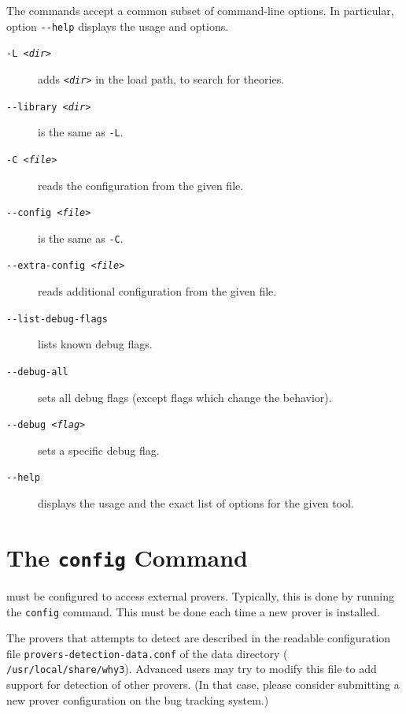 The commands accept a common subset of command-line options. In
particular, option \verb|--help| displays the usage and options.
\begin{description}
\item[\texttt{-L \textsl{<dir>}}]
  adds \texttt{\textsl{<dir>}} in the load path, to search for theories.
\item[\texttt{-{}-library \textsl{<dir>}}]
  is the same as \verb|-L|.
\item[\texttt{-C \textsl{<file>}}]
  reads the configuration from the given file.
\item[\texttt{-{}-config \textsl{<file>}}]
  is the same as \verb|-C|.
\item[\texttt{-{}-extra-config \textsl{<file>}}]
  reads additional configuration from the given file.
\item[\texttt{-{}-list-debug-flags}]
  lists known debug flags.
\item[\texttt{-{}-debug-all}]
  sets all debug flags (except flags which change the behavior).
\item[\texttt{-{}-debug \textsl{<flag>}}]
  sets a specific debug flag.
\item[\texttt{-{}-help}]
  displays the usage and the exact list of options for the given tool.
\end{description}

\section{The \texttt{config} Command}
\label{sec:why3config}

\why must be configured to access external provers. Typically, this is done
by running the \texttt{config} command.
This must be done each time a new prover is installed.%
%

The provers that \why attempts to detect are described in
the readable configuration file \texttt{provers-detection-data.conf}
of the \why data directory (\eg
\texttt{/usr/local/share/why3}). Advanced users may try to modify this
file to add support for detection of other provers. (In that case,
please consider submitting a new prover configuration on the bug
tracking system.)

